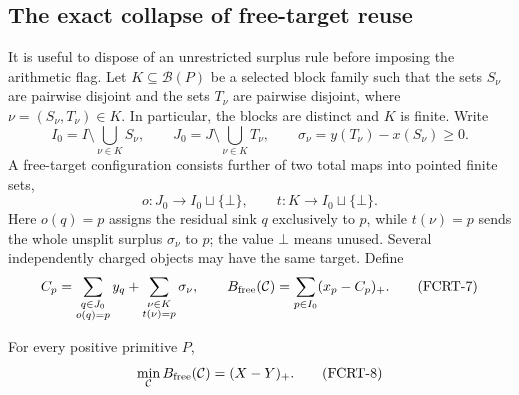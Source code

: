 \subsection{The exact collapse of free-target reuse}

It is useful to dispose of an unrestricted surplus rule before imposing the
arithmetic flag.  Let $K\subseteq\mathcal B(P)$ be a selected block family
such that the sets $S_\nu$ are pairwise disjoint and the sets $T_\nu$ are
pairwise disjoint, where $\nu=(S_\nu,T_\nu)\in K$.  In particular, the
blocks are distinct and $K$ is finite.
Write
\[
 I_0=I\setminus\bigcup_{\nu\in K}S_\nu,
 \qquad
 J_0=J\setminus\bigcup_{\nu\in K}T_\nu,
 \qquad
 \sigma_\nu=y(T_\nu)-x(S_\nu)\ge0.
\tag{FCRT-5}\label{eq:fcrt-free-residual-sets}
\]
A free-target configuration consists further of two total maps into pointed
finite sets,
\[
 o:J_0\longrightarrow I_0\sqcup\{\bot\},
 \qquad
 t:K\longrightarrow I_0\sqcup\{\bot\}.
\tag{FCRT-6}\label{eq:fcrt-free-owners}
\]
Here $o(q)=p$ assigns the residual sink $q$ exclusively to $p$, while
$t(\nu)=p$ sends the whole unsplit surplus $\sigma_\nu$ to $p$; the value
$\bot$ means unused.  Several independently charged objects may have the
same target.  Define
\[
 C_p=\sum_{\substack{q\in J_0\\o(q)=p}}y_q
     +\sum_{\substack{\nu\in K\\t(\nu)=p}}\sigma_\nu,
 \qquad
 B_{\rm free}(\mathcal C)=\sum_{p\in I_0}(x_p-C_p)_+.
\tag{FCRT-7}\label{eq:fcrt-free-boundary}
\]

\begin{proposition}
\label{prop:fcrt-free-collapse}
For every positive primitive $P$,
\[
                 \min_{\mathcal C}B_{\rm free}(\mathcal C)
                 =(X-Y)_+.
\tag{FCRT-8}\label{eq:fcrt-free-collapse}
\]
\end{proposition}

